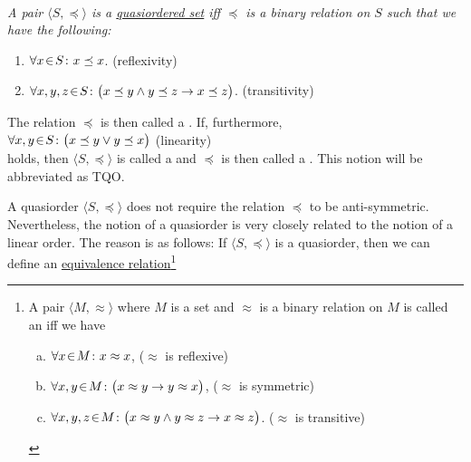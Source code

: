 \begin{Definition}[Quasiorder]  \hspace*{\fill} \\
{\em
  A pair $\langle S, \preceq\rangle$ is a \href{https://en.wikipedia.org/wiki/Preorder}{quasiordered set}   iff $\preceq$ is a 
  binary relation on $S$ such that we have the following:
  \begin{enumerate}
  \item $\forall x \!\in\! S\colon x \preceq x$. \hspace*{\fill} (reflexivity)
  \item $\forall x, y, z \!\in\! S \colon \bigl(x \preceq y \wedge y \preceq z \rightarrow x \preceq z\bigr)$. 
         \hspace*{\fill} (transitivity)
  \end{enumerate}
  The relation $\preceq$ is then called a .  If, furthermore,
  \\[0.2cm]
  \hspace*{1.3cm}
  $\forall x, y \!\in\! S \colon \bigl(x \preceq y \vee y \preceq x\bigr)$ \hspace*{\fill} (linearity) 
  \\[0.2cm]
  holds, then $\langle S, \preceq \rangle$ is called a  and $\preceq$ is then
  called a .  This notion will be abbreviated as \textsc{TQO}.
}
\end{Definition}
A quasiorder $\langle S, \preceq \rangle$ does not require the relation $\preceq$ to be
anti-symmetric.  Nevertheless, the notion of a quasiorder is very closely related to the notion of a
linear order.  The reason is as follows:  If $\langle S, \preceq \rangle$ is a quasiorder, then we can define an
\href{https://en.wikipedia.org/wiki/Equivalence_relation}{equivalence relation}\footnote{
  A pair $\langle M, \approx \rangle$ where $M$ is a set and $\approx$ is a binary relation on $M$ is called an
   iff we have
  \begin{enumerate}[(a)]
  \item $\forall x \!\in\! M \colon x \approx x$,                      \hspace*{\fill} ($\approx$ is reflexive)
  \item $\forall x, y \!\in\! M \colon \bigl(x \approx y \rightarrow y \approx x\bigr)$,
        \hspace*{\fill} ($\approx$ is symmetric)
  \item $\forall x, y, z \!\in\! M \colon \bigl(x \approx y \wedge y \approx z \rightarrow x \approx z\bigr)$.
        \hspace*{\fill} ($\approx$ is transitive)
\end{enumerate}
}
